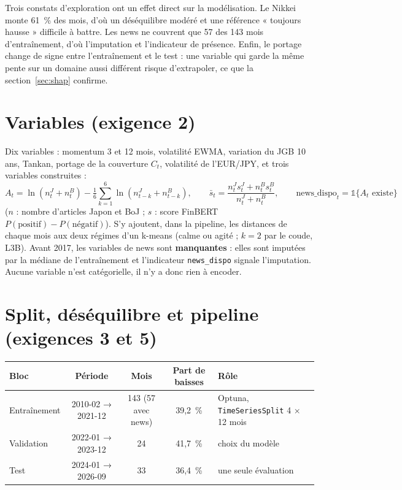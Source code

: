 \documentclass[11pt,a4paper]{article}
\begin{document}
Trois constats d'exploration ont un effet direct sur la modélisation. Le Nikkei monte 61~\% des mois, d'où un
déséquilibre modéré et une référence « toujours hausse » difficile à battre. Les news ne couvrent que 57 des 143 mois
d'entraînement, d'où l'imputation et l'indicateur de présence. Enfin, le portage change de signe entre l'entraînement
et le test : une variable qui garde la même pente sur un domaine aussi différent risque d'extrapoler, ce que la
section~\ref{sec:shap} confirme.

\section{Variables (exigence 2)}

Dix variables : momentum 3 et 12 mois, volatilité EWMA, variation du JGB 10 ans, Tankan, portage de la couverture
$C_t$, volatilité de l'EUR/JPY, et trois variables construites :
\[
A_t=\ln(n^J_t+n^B_t)-\tfrac16\textstyle\sum_{k=1}^{6}\ln(n^J_{t-k}+n^B_{t-k}),\qquad
\bar s_t=\frac{n^J_t s^J_t+n^B_t s^B_t}{n^J_t+n^B_t},\qquad \text{news\_dispo}_t=\mathbb 1\{A_t\text{ existe}\}
\]
($n$ : nombre d'articles Japon et BoJ ; $s$ : score FinBERT $P(\text{positif})-P(\text{négatif})$). S'y ajoutent, dans la
pipeline, les distances de chaque mois aux deux régimes d'un k-means (calme ou agité ; $k=2$ par le coude, L3B).
Avant 2017, les variables de news sont \textbf{manquantes} : elles sont imputées par la médiane de l'entraînement et
l'indicateur \texttt{news\_dispo} signale l'imputation. Aucune variable n'est catégorielle, il n'y a donc rien à encoder.

\section{Split, déséquilibre et pipeline (exigences 3 et 5)}

\begin{table}[H]\centering\small
\begin{tabular}{lcccp{4.4cm}}\toprule
Bloc & Période & Mois & Part de baisses & Rôle \\\midrule
Entraînement & 2010-02 → 2021-12 & 143 (57 avec news) & 39,2~\% & Optuna, \texttt{TimeSeriesSplit} 4 × 12 mois \\
Validation & 2022-01 → 2023-12 & 24 & 41,7~\% & choix du modèle \\
Test & 2024-01 → 2026-09 & 33 & 36,4~\% & une seule évaluation \\\bottomrule
\end{tabular}\end{table}
\end{document}
